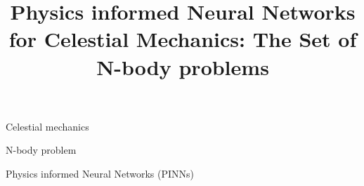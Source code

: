 \documentclass[draft]{agujournal2019}
\begin{document}
\title{Physics informed Neural Networks for Celestial Mechanics: The Set of N-body problems}

%
%












\begin{keypoints}
\item Celestial mechanics
\item N-body problem
\item Physics informed Neural Networks (PINNs)
\end{keypoints}
\end{document}
